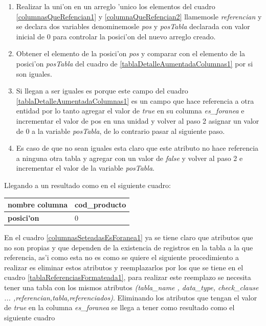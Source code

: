 \begin{enumerate}
\item Realizar la uni'on en un arreglo 'unico los elementos del cuadro \ref{columnasQueRefencian1} y \ref{columnaQueRefencian2} llamemosle \textit{referencian} y se declara dos variables denominemosle \textit{pos} y \textit{posTabla} declarada con valor inicial de 0 para controlar la posici'on del nuevo arreglo creado.
\item Obtener el elemento de la posici'on \textit{pos} y comparar con el elemento de la posici'on \textit{posTabla} del cuadro de \ref{tablaDetalleAumentadaColumnas1} por si son iguales.
\item Si llegan a ser iguales es porque este campo del cuadro \ref{tablaDetalleAumentadaColumnas1} es un campo que hace referencia a otra entidad por lo tanto agregar el valor de \textit{true} en su columna \textit{es\_foranea} e incrementar el valor de pos en una unidad y volver al paso 2 asignar un valor de 0 a la variable \textit{posTabla}, de lo contrario pasar al siguiente paso.
\item Es caso de que no sean iguales esta claro que este atributo no hace referencia a ninguna otra tabla y agregar con un valor de \textit{false} y volver al paso 2 e incrementar el valor de la variable \textit{posTabla}.
\end{enumerate}
Llegando a un resultado como en el siguiente cuadro:

 
\begin{center}
  \label{columnasSeteadasEsForanea1} %
  \begin{tabular}{|l|l|}
  \hline 
  \textbf{nombre columna} & cod\_producto \\ \hline
  \textbf{posici'on}      & 0             \\ \hline
  \end{tabular}
\end{center}

En el cuadro \ref{columnasSeteadasEsForanea1} ya se tiene claro que atributos que no son propias y que dependen de la existencia de registros en la tabla a la que referencia, as'i como esta no es como se quiere el siguiente procedimiento a realizar es eliminar estos atributos y reemplazarlos por los que se tiene en el cuadro \ref{tablaReferenciasFormateada1}, para realizar este reemplazo se necesita tener una tabla con los mismos atributos \textit{(tabla\_name , data\_type, check\_clause ... ,referencian,tabla,referenciados)}. Eliminando los atributos que tengan el valor de \textit{true} en la columna \textit{es\_foranea} se llega a tener como resultado como el siguiente cuadro

